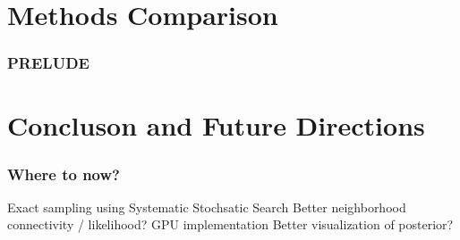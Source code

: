 \documentclass{beamer}
\begin{document}
\section{Methods Comparison}
\begin{frame}
  \frametitle{PRELUDE}
\end{frame}

\section{Concluson and Future Directions}
\begin{frame}
  \frametitle{Where to now?}
  Exact sampling using Systematic Stochsatic Search
  Better neighborhood connectivity / likelihood? 
  GPU implementation 
  Better visualization of posterior?
\end{frame}
\end{document}
